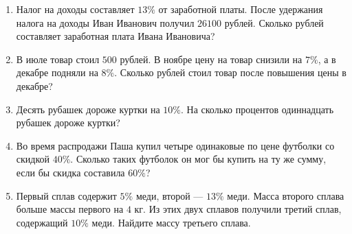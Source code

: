 \documentclass[12pt, a4paper]{article}
\begin{document}
\begin{enumerate}
	\item Налог на доходы составляет $13\%$ от заработной платы. После удержания налога на доходы Иван Иванович получил $26 100$ рублей. Сколько рублей составляет заработная плата Ивана Ивановича?
	\item В июле товар стоил $500$ рублей. В ноябре цену на товар снизили на $7\%$, а в декабре подняли на $8\%$. Сколько рублей стоил товар после повышения цены в декабре?
	\item Десять рубашек дороже куртки на $10\%$. На сколько процентов одиннадцать рубашек дороже куртки?
	\item Во время распродажи Паша купил четыре одинаковые по цене футболки со скидкой $40\%$. Сколько таких футболок он мог бы купить на ту же сумму, если бы скидка составила $60\%$?
	\item Первый сплав содержит $5\%$ меди, второй --- $13\%$ меди. Масса второго сплава больше массы первого на $4$ кг. Из этих двух сплавов получили третий сплав, содержащий $10\%$ меди. Найдите массу третьего сплава.
\end{enumerate}
\end{document}
